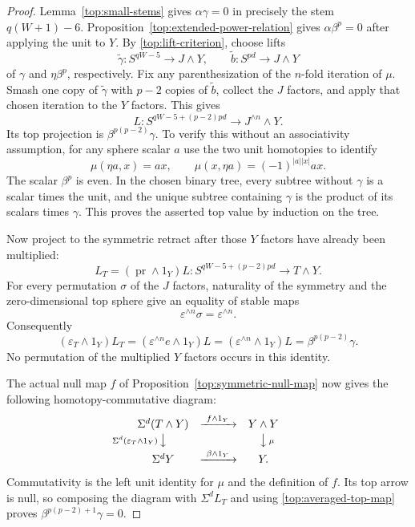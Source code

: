 \begin{proof}
Lemma~\ref{top:small-stems} gives $\alpha\gamma=0$ in precisely
the stem $q(W+1)-6$. Proposition~\ref{top:extended-power-relation}
gives $\alpha\beta^p=0$ after applying the unit to $Y$.
By \eqref{top:lift-criterion}, choose lifts
\[
 \widetilde\gamma:S^{qW-5}\longrightarrow J\wedge Y,
 \qquad
 \widetilde b:S^{pd}\longrightarrow J\wedge Y
\]
of $\gamma$ and $\eta\beta^p$, respectively.
Fix any parenthesization of the $n$-fold iteration of $\mu$.
Smash one copy of $\widetilde\gamma$ with $p-2$ copies of
$\widetilde b$, collect the $J$ factors, and apply that chosen
iteration to the $Y$ factors. This gives
\[
 L:S^{qW-5+(p-2)pd}\longrightarrow J^{\wedge n}\wedge Y.
\]
Its top projection is $\beta^{p(p-2)}\gamma$.
To verify this without an associativity assumption, for any
sphere scalar $a$ use the two unit homotopies to identify
\[
 \mu(\eta a,x)=a x,\qquad
 \mu(x,\eta a)=(-1)^{|a||x|}a x.
\]
The scalar $\beta^p$ is even. In the chosen binary tree, every
subtree without $\gamma$ is a scalar times the unit, and the
unique subtree containing $\gamma$ is the product of its scalars
times $\gamma$. This proves the asserted top value by induction
on the tree.

Now project to the symmetric retract after those $Y$ factors
have already been multiplied:
\[
 L_T=(\operatorname{pr}\wedge1_Y)L:
 S^{qW-5+(p-2)pd}\longrightarrow T\wedge Y.
\]
For every permutation $\sigma$ of the $J$ factors, naturality of
the symmetry and the zero-dimensional top sphere give an equality
of stable maps
\[
 \varepsilon^{\wedge n}\sigma=\varepsilon^{\wedge n}.
\]
Consequently
\begin{equation}
\label{top:averaged-top-map}
 (\varepsilon_T\wedge1_Y)L_T
 = (\varepsilon^{\wedge n}e\wedge1_Y)L
 = (\varepsilon^{\wedge n}\wedge1_Y)L
 =\beta^{p(p-2)}\gamma.
\end{equation}
No permutation of the multiplied $Y$ factors occurs in this
identity.

The actual null map $f$ of Proposition~\ref{top:symmetric-null-map}
now gives the following homotopy-commutative diagram:
\begin{equation}
\label{top:null-map-diagram}
\begin{array}{ccc}
\Sigma^d(T\wedge Y)&\xrightarrow{\ f\wedge1_Y\ }&Y\wedge Y\\[2pt]
\mathllap{\scriptstyle\Sigma^d(\varepsilon_T\wedge1_Y)\,}\big\downarrow
&&\big\downarrow\mathrlap{\,\scriptstyle\mu}\\[2pt]
\Sigma^dY&\xrightarrow{\ \beta\wedge1_Y\ }&Y.
\end{array}
\end{equation}
Commutativity is the left unit identity for $\mu$ and the
definition of $f$. Its top arrow is null, so composing the
diagram with $\Sigma^dL_T$ and using
\eqref{top:averaged-top-map} proves
$\beta^{p(p-2)+1}\gamma=0$.
\end{proof}

